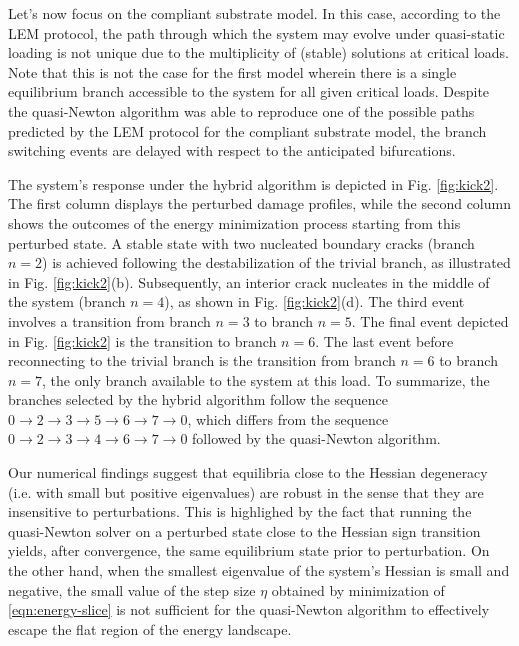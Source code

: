 Let's now focus on the compliant substrate model. In this case, according to the LEM protocol, the path through which the system may evolve under quasi-static loading is not unique due to the multiplicity of (stable) solutions at critical loads.
Note that this is not the case for the first model wherein there is a single equilibrium branch accessible to the system for all given critical loads.
Despite the quasi-Newton algorithm was able to reproduce one of the possible paths predicted by the LEM protocol for the compliant substrate model, {the branch switching events} {are delayed with respect to the} anticipated bifurcations. 


The system's response under the hybrid algorithm is depicted in Fig. \ref{fig:kick2}. The first column displays the perturbed damage profiles, while the second column shows the outcomes of the energy minimization process starting from  this perturbed state. A stable state with two nucleated boundary cracks (branch \( n=2 \)) is achieved following the destabilization of the trivial branch, as illustrated in Fig. \ref{fig:kick2}(b). Subsequently, an interior crack nucleates in the middle of the system (branch \( n=4 \)), as shown in Fig. \ref{fig:kick2}(d). The third event involves a transition from branch \( n=3 \) to branch \( n=5 \). The final event depicted in Fig. \ref{fig:kick2} is the transition to branch \( n=6 \). The last event before reconnecting to the trivial branch is the transition from branch \( n=6 \) to branch \( n=7 \), the only  branch available to the system at this load. To summarize, the branches selected by the hybrid algorithm follow the sequence 
\( 0 \rightarrow 2 \rightarrow 3 \rightarrow 5 \rightarrow 6 \rightarrow 7 \rightarrow 0 \), 
which differs from the sequence 
\( 0 \rightarrow 2 \rightarrow 3 \rightarrow 4 \rightarrow 6 \rightarrow 7 \rightarrow 0 \) 
followed by the quasi-Newton algorithm.

Our numerical findings suggest that equilibria close to the Hessian degeneracy (i.e. with small but positive eigenvalues) are robust in the sense that they are insensitive to perturbations. This is highlighed by the fact that running the quasi-Newton solver on a perturbed state close to the Hessian sign transition yields, after convergence, the same equilibrium state prior to perturbation.
On the other hand, when the smallest eigenvalue of the system's Hessian is small and negative, the
small value of the step size \( \eta \) obtained by minimization of \eqref{eqn:energy-slice} is not sufficient for the quasi-Newton algorithm to effectively escape the flat region of the energy landscape. 

